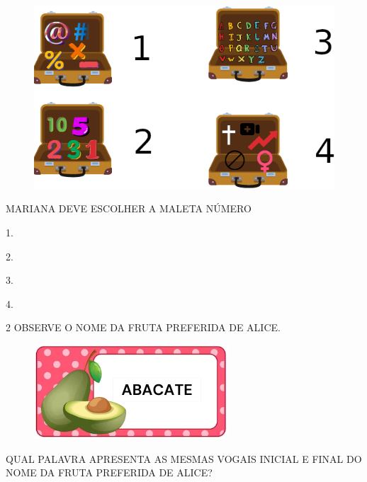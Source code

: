 \begin{figure}[H]
\includegraphics[width=\textwidth]{media/image209.png}
\end{figure}

MARIANA DEVE ESCOLHER A MALETA NÚMERO

\begin{multicols}{4}
\begin{escolha}[itemsep=0pt]
\item 1.

\item 2.

\item 3.

\item 4.
\end{escolha}
\end{multicols}

\num{2} OBSERVE O NOME DA FRUTA PREFERIDA DE ALICE.

\begin{minipage}{.5\textwidth}
\begin{figure}[H]
\centering
\includegraphics[width=\textwidth]{media/image212.png}
\end{figure}
\end{minipage}
\hspace{0.5cm}
\begin{minipage}{.5\textwidth}
QUAL PALAVRA APRESENTA AS MESMAS VOGAIS INICIAL E FINAL DO NOME DA FRUTA PREFERIDA DE ALICE?
\end{minipage}

